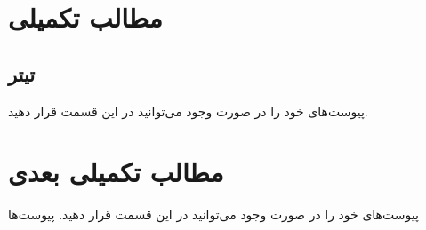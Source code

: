 \appendix

\chapter{مطالب تکمیلی}

\section{تیتر}

پیوست‌های خود را در صورت وجود می‌توانید در این قسمت قرار دهید. 


\chapter{مطالب تکمیلی بعدی}

پیوست‌های خود را در صورت وجود می‌توانید در این قسمت قرار دهید. 
پیوست‌ها